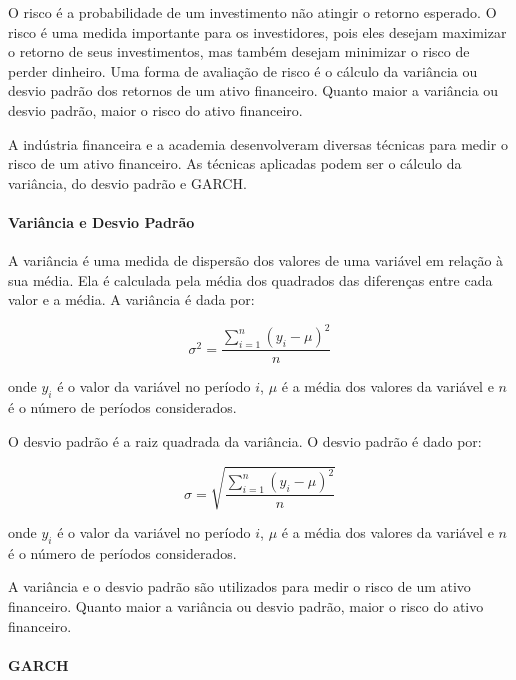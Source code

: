                 \ipar O risco é a probabilidade de um investimento não atingir o retorno esperado. O risco é uma medida importante para os investidores, pois eles desejam maximizar o retorno de seus investimentos, mas também desejam minimizar o risco de perder dinheiro. Uma forma de avaliação de risco é o cálculo da variância ou desvio padrão dos retornos de um ativo financeiro. Quanto maior a variância ou desvio padrão, maior o risco do ativo financeiro.

                \ipar A indústria financeira e a academia desenvolveram diversas técnicas para medir o risco de um ativo financeiro. As técnicas aplicadas podem ser o cálculo da variância, do desvio padrão e GARCH.

            \paragraph{Variância e Desvio Padrão}

                \ipar A variância é uma medida de dispersão dos valores de uma variável em relação à sua média. Ela é calculada pela média dos quadrados das diferenças entre cada valor e a média. A variância é dada por:

                \begin{equation}
                    \sigma^2 = \frac{{\sum_{i=1}^{n} (y_i - \mu)^2}}{{n}}
                \end{equation}

                \noindent onde $y_i$ é o valor da variável no período $i$, $\mu$ é a média dos valores da variável e $n$ é o número de períodos considerados.

                \ipar O desvio padrão é a raiz quadrada da variância. O desvio padrão é dado por:

                \begin{equation}
                    \sigma = \sqrt{\frac{{\sum_{i=1}^{n} (y_i - \mu)^2}}{{n}}}
                \end{equation}

                \noindent onde $y_i$ é o valor da variável no período $i$, $\mu$ é a média dos valores da variável e $n$ é o número de períodos considerados.

                \ipar A variância e o desvio padrão são utilizados para medir o risco de um ativo financeiro. Quanto maior a variância ou desvio padrão, maior o risco do ativo financeiro.


            \paragraph{\acrshort{GARCH}}

